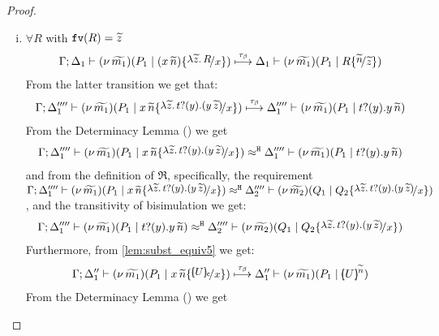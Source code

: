 \begin{proof}
\begin{enumerate}
\begin{enumerate}[i.]
				\item	\noi $\forall R$ with $\mathtt{fv}(R) = \widetilde{z}$
%
						\begin{eqnarray}
							\horel{\Gamma}{\Delta_1}{\newsp{\widetilde{m_1}}{P_1 \Par (\appl{x}{\widetilde{n}}) \subst{\abs{\widetilde{z}}{R}}{x}}}
							{\hby{\btau}}
							{\Delta_1}{\newsp{\widetilde{m_1}}{P_1 \Par  R \subst{\widetilde{n}}{\widetilde{z}}}}
							\label{lem:subst_equiv5}
						\end{eqnarray}
%
						\noi
							From the latter transition we get that:
%
						\begin{eqnarray*}
							\horel{\Gamma}{\Delta_1''''}{\newsp{\widetilde{m_1}}{P_1 \Par \appl{x}{\widetilde{n}} \subst{\auxtr{t}}{x}}}
							{\hby{\btau}}
							{\Delta_1''''}{\newsp{\widetilde{m_1}}{P_1 \Par \binp{t}{y} \appl{y}{\widetilde{n}}}}
						\end{eqnarray*}
%
						From the Determinacy Lemma () we get
%
						\begin{eqnarray*}
							\horel{\Gamma}{\Delta_1''''}{\newsp{\widetilde{m_1}}{P_1 \Par \appl{x}{\widetilde{n}} \subst{\auxtr{t}}{x}}}
							{\hwb}
							{\Delta_1''''}{\newsp{\widetilde{m_1}}{P_1 \Par \binp{t}{y} \appl{y}{\widetilde{n}}}}
						\end{eqnarray*}
%
						and from the definition of $\Re$, specifically, the requirement
						$\horel{\Gamma}{\Delta_1''''}
						{\newsp{\widetilde{m_1}}{P_1 \Par \appl{x}{\widetilde{n}} \subst{\auxtr{t}}{x} }}
						{\hwb}
						{\Delta_2''''}{\newsp{\widetilde{m_2}}{Q_1 \Par Q_2 \subst{\auxtr{t}}{x}}}$, and the
						transitivity of bisimulation we get:
%
						\begin{eqnarray}
							\horel{\Gamma}{\Delta_1''''}{\newsp{\widetilde{m_1}}{P_1 \Par \binp{t}{y} \appl{y}{\widetilde{n}}}}
							{\hwb}
							{\Delta_2''''}{\newsp{\widetilde{m_2}}{Q_1 \Par Q_2 \subst{\auxtr{t}}{x}}}
							\label{lem:subst_equiv7}
						\end{eqnarray}
%
						Furthermore, from \eqref{lem:subst_equiv5} we get:
%
						\begin{eqnarray*}
							\horel{\Gamma}{\Delta_1''}{\newsp{\widetilde{m_1}}{P_1 \Par \appl{x}{\widetilde{n}} \subst{\omapchar{U}}{x}}}
							{\hby{\btau}}
							{\Delta_1''}{\newsp{\widetilde{m_1}}{P_1 \Par \mapchar{U}{\widetilde{n}}}}%
						\end{eqnarray*}
%
						From the Determinacy Lemma () we get

\end{enumerate}
\end{enumerate}
\end{proof}
